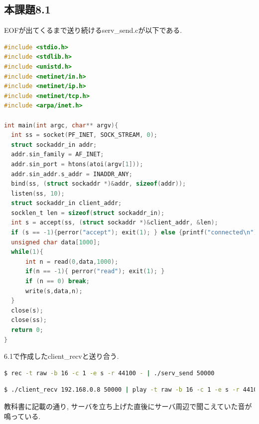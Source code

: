 \documentclass{ltjsarticle}
\begin{document}
\subsection*{本課題8.1}
EOFが出てくるまで送り続けるserv\_send.cが以下である. 
\begin{lstlisting}[caption=serv\_send.c,language=C]
#include <stdio.h>
#include <stdlib.h>
#include <unistd.h>
#include <netinet/in.h>
#include <netinet/ip.h>
#include <netinet/tcp.h>
#include <arpa/inet.h>

int main(int argc, char** argv){
  int ss = socket(PF_INET, SOCK_STREAM, 0);
  struct sockaddr_in addr;
  addr.sin_family = AF_INET;
  addr.sin_port = htons(atoi(argv[1]));
  addr.sin_addr.s_addr = INADDR_ANY;
  bind(ss, (struct sockaddr *)&addr, sizeof(addr));
  listen(ss, 10);
  struct sockaddr_in client_addr;
  socklen_t len = sizeof(struct sockaddr_in);
  int s = accept(ss, (struct sockaddr *)&client_addr, &len);
  if (s == -1){perror("accept"); exit(1); } else {printf("connected\n");}
  unsigned char data[1000];
  while(1){
      int n = read(0,data,1000);
      if(n == -1){ perror("read"); exit(1); }
      if (n == 0) break;
      write(s,data,n);
  }
  close(s);
  close(ss);
  return 0;
}
\end{lstlisting}
6.1で作成したclient\_recvと送り合う. 
\begin{lstlisting}[caption=サーバ側,language=bash]
$ rec -t raw -b 16 -c 1 -e s -r 44100 - | ./serv_send 50000
\end{lstlisting}
\begin{lstlisting}[caption=クライアント側,language=bash]
$ ./client_recv 192.168.0.8 50000 | play -t raw -b 16 -c 1 -e s -r 44100 -
\end{lstlisting}
教科書に記載の通り, サーバを立ち上げた直後にサーバ周辺で聞こえていた音が鳴っている.
\end{document}
